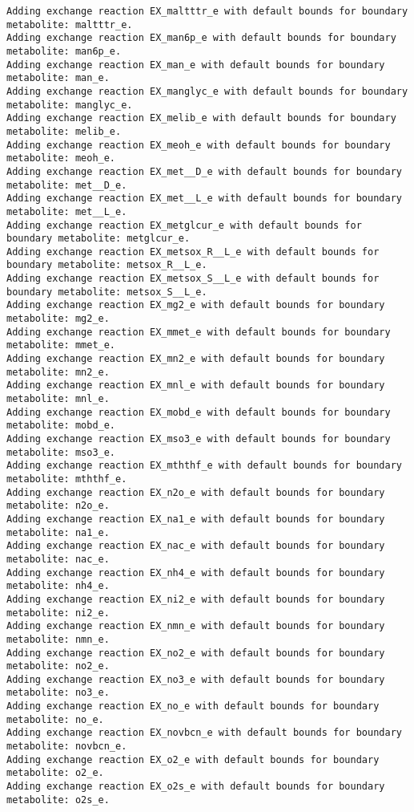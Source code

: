 \documentclass[
  letterpaper,
  DIV=11,
  numbers=noendperiod]{scrartcl}
\begin{document}
\begin{verbatim}
Adding exchange reaction EX_maltttr_e with default bounds for boundary metabolite: maltttr_e.
Adding exchange reaction EX_man6p_e with default bounds for boundary metabolite: man6p_e.
Adding exchange reaction EX_man_e with default bounds for boundary metabolite: man_e.
Adding exchange reaction EX_manglyc_e with default bounds for boundary metabolite: manglyc_e.
Adding exchange reaction EX_melib_e with default bounds for boundary metabolite: melib_e.
Adding exchange reaction EX_meoh_e with default bounds for boundary metabolite: meoh_e.
Adding exchange reaction EX_met__D_e with default bounds for boundary metabolite: met__D_e.
Adding exchange reaction EX_met__L_e with default bounds for boundary metabolite: met__L_e.
Adding exchange reaction EX_metglcur_e with default bounds for boundary metabolite: metglcur_e.
Adding exchange reaction EX_metsox_R__L_e with default bounds for boundary metabolite: metsox_R__L_e.
Adding exchange reaction EX_metsox_S__L_e with default bounds for boundary metabolite: metsox_S__L_e.
Adding exchange reaction EX_mg2_e with default bounds for boundary metabolite: mg2_e.
Adding exchange reaction EX_mmet_e with default bounds for boundary metabolite: mmet_e.
Adding exchange reaction EX_mn2_e with default bounds for boundary metabolite: mn2_e.
Adding exchange reaction EX_mnl_e with default bounds for boundary metabolite: mnl_e.
Adding exchange reaction EX_mobd_e with default bounds for boundary metabolite: mobd_e.
Adding exchange reaction EX_mso3_e with default bounds for boundary metabolite: mso3_e.
Adding exchange reaction EX_mththf_e with default bounds for boundary metabolite: mththf_e.
Adding exchange reaction EX_n2o_e with default bounds for boundary metabolite: n2o_e.
Adding exchange reaction EX_na1_e with default bounds for boundary metabolite: na1_e.
Adding exchange reaction EX_nac_e with default bounds for boundary metabolite: nac_e.
Adding exchange reaction EX_nh4_e with default bounds for boundary metabolite: nh4_e.
Adding exchange reaction EX_ni2_e with default bounds for boundary metabolite: ni2_e.
Adding exchange reaction EX_nmn_e with default bounds for boundary metabolite: nmn_e.
Adding exchange reaction EX_no2_e with default bounds for boundary metabolite: no2_e.
Adding exchange reaction EX_no3_e with default bounds for boundary metabolite: no3_e.
Adding exchange reaction EX_no_e with default bounds for boundary metabolite: no_e.
Adding exchange reaction EX_novbcn_e with default bounds for boundary metabolite: novbcn_e.
Adding exchange reaction EX_o2_e with default bounds for boundary metabolite: o2_e.
Adding exchange reaction EX_o2s_e with default bounds for boundary metabolite: o2s_e.

\end{verbatim}
\end{document}
